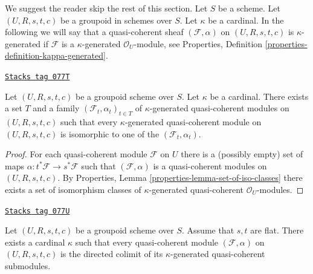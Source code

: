 We suggest the reader skip the rest of this section. Let $S$ be a scheme.
Let $(U, R, s, t, c)$ be a groupoid in schemes over $S$. Let $\kappa$ be a
cardinal. In the following we will say that a quasi-coherent sheaf
$(\mathcal{F}, \alpha)$ on $(U, R, s, t, c)$ is $\kappa$-generated if
$\mathcal{F}$ is a $\kappa$-generated $\mathcal{O}_U$-module, see
Properties, Definition \ref{properties-definition-kappa-generated}.

\begin{lemma}
\label{groupoids-lemma-set-of-iso-classes}
\href{https://stacks.math.columbia.edu/tag/077T}{\texttt{Stacks tag 077T}}

Let $(U, R, s, t, c)$ be a groupoid scheme over $S$.
Let $\kappa$ be a cardinal.
There exists a set $T$ and a family $(\mathcal{F}_t, \alpha_t)_{t \in T}$ of
$\kappa$-generated quasi-coherent modules on $(U, R, s, t, c)$
such that every $\kappa$-generated quasi-coherent module on
$(U, R, s, t, c)$ is isomorphic to one of the $(\mathcal{F}_t, \alpha_t)$.
\end{lemma}

\begin{proof}
For each quasi-coherent module $\mathcal{F}$ on $U$ there is a
(possibly empty) set of maps $\alpha : t^*\mathcal{F} \to s^*\mathcal{F}$
such that $(\mathcal{F}, \alpha)$ is a quasi-coherent modules on
$(U, R, s, t, c)$. By
Properties, Lemma \ref{properties-lemma-set-of-iso-classes}
there exists a set of isomorphism classes of $\kappa$-generated
quasi-coherent $\mathcal{O}_U$-modules.
\end{proof}

\begin{lemma}
\label{groupoids-lemma-colimit-kappa}
\href{https://stacks.math.columbia.edu/tag/077U}{\texttt{Stacks tag 077U}}

Let $(U, R, s, t, c)$ be a groupoid scheme over $S$.
Assume that $s, t$ are flat. There exists a
cardinal $\kappa$ such that every quasi-coherent module
$(\mathcal{F}, \alpha)$ on $(U, R, s, t, c)$
is the directed colimit of its $\kappa$-generated
quasi-coherent submodules.
\end{lemma}

